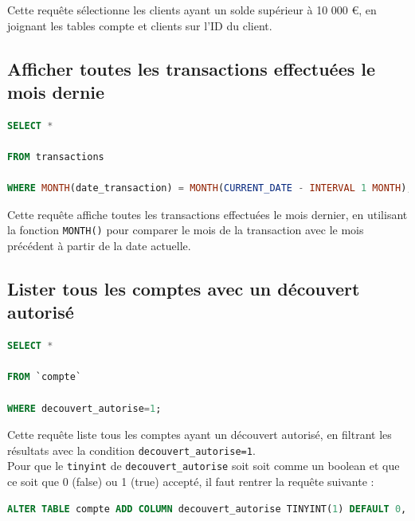 \documentclass[12pt,a4paper]{article}
\begin{document}
Cette requête sélectionne les clients ayant un solde supérieur à 10 000 €, en joignant les tables compte et clients sur l'ID du client. 

	\subsection{Afficher toutes les transactions effectuées le mois dernie}
	
\begin{lstlisting}[language=SQL]
SELECT *  

FROM transactions  

WHERE MONTH(date_transaction) = MONTH(CURRENT_DATE - INTERVAL 1 MONTH); 
\end{lstlisting}

\vspace{.5cm}

Cette requête affiche toutes les transactions effectuées le mois dernier, en utilisant la fonction \texttt{MONTH()} pour comparer le mois de la transaction avec le mois précédent à partir de la date actuelle. 

	\subsection{Lister tous les comptes avec un découvert autorisé}
	
\begin{lstlisting}[language=SQL]
SELECT *  

FROM `compte`  

WHERE decouvert_autorise=1; 
\end{lstlisting}

\vspace{.5cm}

Cette requête liste tous les comptes ayant un découvert autorisé, en filtrant les résultats avec la condition \texttt{decouvert\_autorise=1}. \\
Pour que le \texttt{tinyint} de \texttt{decouvert\_autorise} soit soit comme un boolean et que ce soit que 0 (false) ou 1 (true) accepté, il faut rentrer la requête suivante : \\

\begin{lstlisting}[language=SQL]
ALTER TABLE compte ADD COLUMN decouvert_autorise TINYINT(1) DEFAULT 0, ADD CONSTRAINT chk_decouvert_autorise CHECK (decouvert_autorise IN (0, 1)); 
\end{lstlisting}

\newpage
\end{document}
